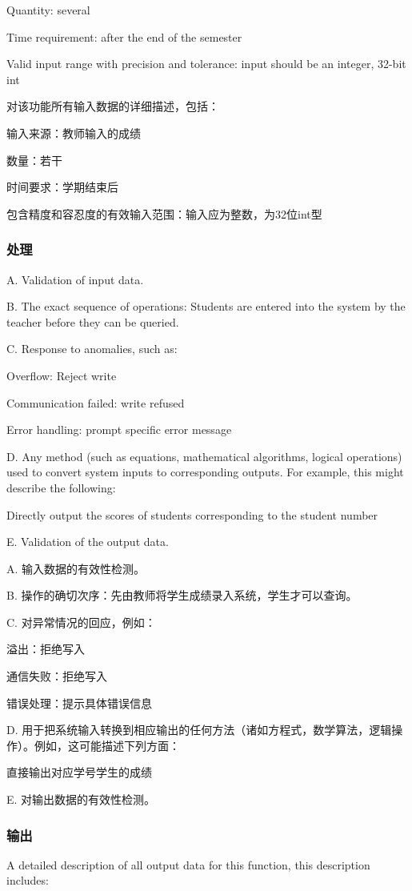 Quantity: several

Time requirement: after the end of the semester

Valid input range with precision and tolerance: input should be an integer, 32-bit int

对该功能所有输入数据的详细描述，包括：

	输入来源：教师输入的成绩

	数量：若干
	
	时间要求：学期结束后
	
	包含精度和容忍度的有效输入范围：输入应为整数，为32位int型

\subsubsection{处理}

A. Validation of input data.

B. The exact sequence of operations: Students are entered into the system by the teacher before they can be queried.

C. Response to anomalies, such as:

Overflow: Reject write

Communication failed: write refused

Error handling: prompt specific error message

D. Any method (such as equations, mathematical algorithms, logical operations) used to convert system inputs to corresponding outputs. For example, this might describe the following:

Directly output the scores of students corresponding to the student number

E. Validation of the output data.

A. 输入数据的有效性检测。

B. 操作的确切次序：先由教师将学生成绩录入系统，学生才可以查询。

C. 对异常情况的回应，例如：

	溢出：拒绝写入
	
	通信失败：拒绝写入
	
	错误处理：提示具体错误信息

D. 用于把系统输入转换到相应输出的任何方法（诸如方程式，数学算法，逻辑操作）。例如，这可能描述下列方面：

	直接输出对应学号学生的成绩
		
E.	对输出数据的有效性检测。
\subsubsection{输出}
A detailed description of all output data for this function, this description includes:

